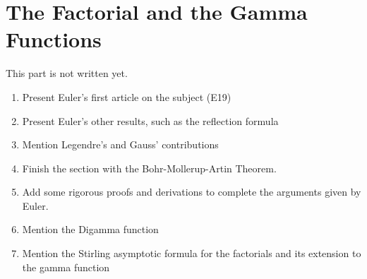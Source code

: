 \chapter{The Factorial and the Gamma Functions}\label{chap:GammaFunction}

This part is not written yet.

\td
\begin{enumerate}
    \item Present Euler's first article on the subject (E19)
    \item Present Euler's other results, such as the reflection formula
    \item Mention Legendre's and Gauss' contributions
    \item Finish the section with the Bohr-Mollerup-Artin Theorem.
    \item Add some rigorous proofs and derivations to complete the arguments given by Euler.
    \item Mention the Digamma function
    \item Mention the Stirling asymptotic formula for the factorials and its extension to the gamma function
\end{enumerate}
\td
